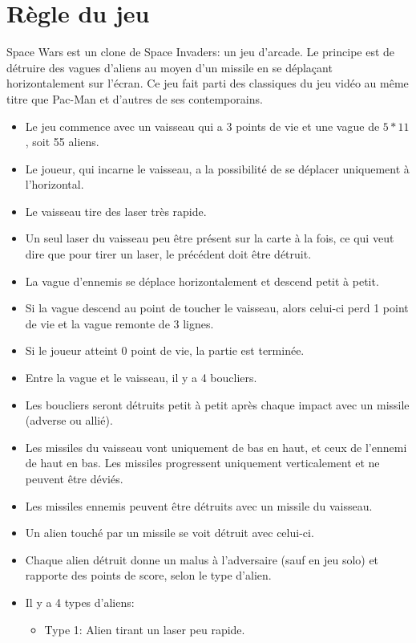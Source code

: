 \documentclass[french, 11pt]{article}
\begin{document}
		\section{Règle du jeu}
		Space Wars est un clone de Space Invaders: un jeu d'arcade. Le principe est de détruire des vagues d'aliens au moyen d'un missile en se déplaçant horizontalement sur l'écran. Ce jeu fait parti des classiques du jeu vidéo au même titre que Pac-Man et d'autres de ses contemporains.
		\\
		\begin{itemize}
			\item Le jeu commence avec un vaisseau qui a 3 points de vie et une vague de $5 * 11$, soit 55 aliens.
			\item Le joueur, qui incarne le vaisseau, a la possibilité de se déplacer uniquement à l'horizontal.
			\item Le vaisseau tire des laser très rapide.
			\item Un seul laser du vaisseau peu être présent sur la carte à la fois, ce qui veut dire que pour tirer un laser, le précédent doit être détruit.
			\item La vague d'ennemis se déplace horizontalement et descend petit à petit.
			\item Si la vague descend au point de toucher le vaisseau, alors celui-ci perd 1 point de vie et la vague remonte de 3 lignes.
			\item Si le joueur atteint 0 point de vie, la partie est terminée.
			\item Entre la vague et le vaisseau, il y a 4 boucliers.
			\item Les boucliers seront détruits petit à petit après chaque impact avec un missile (adverse ou allié).
			\item Les missiles du vaisseau vont uniquement de bas en haut, et ceux de l'ennemi de haut en bas. Les missiles progressent uniquement verticalement et ne peuvent être déviés.
			\item Les missiles ennemis peuvent être détruits avec un missile du vaisseau.
			\item Un alien touché par un missile se voit détruit avec celui-ci.
			\item Chaque alien détruit donne un malus à l'adversaire (sauf en jeu solo) et rapporte des points de score, selon le type d'alien.
			\item Il y a 4 types d'aliens:
			\begin{itemize}
				\item Type 1: Alien tirant un laser peu rapide.

\end{itemize}
\end{itemize}
\end{document}
